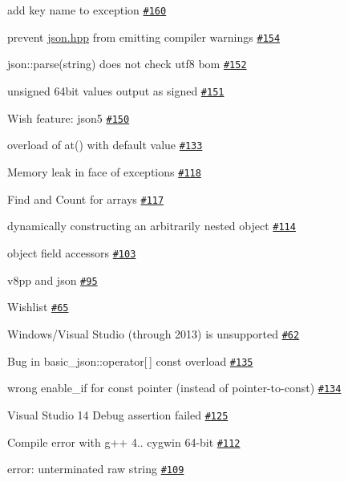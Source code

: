 \begin{DoxyItemize}
\item add key name to exception \href{https://github.com/nlohmann/json/issues/160}{\tt \#160}
\item prevent \hyperlink{a00257_source}{json.\+hpp} from emitting compiler warnings \href{https://github.com/nlohmann/json/issues/154}{\tt \#154}
\item json\+::parse(string) does not check utf8 bom \href{https://github.com/nlohmann/json/issues/152}{\tt \#152}
\item unsigned 64bit values output as signed \href{https://github.com/nlohmann/json/issues/151}{\tt \#151}
\item Wish feature\+: json5 \href{https://github.com/nlohmann/json/issues/150}{\tt \#150}
\item overload of at() with default value \href{https://github.com/nlohmann/json/issues/133}{\tt \#133}
\item Memory leak in face of exceptions \href{https://github.com/nlohmann/json/issues/118}{\tt \#118}
\item Find and Count for arrays \href{https://github.com/nlohmann/json/issues/117}{\tt \#117}
\item dynamically constructing an arbitrarily nested object \href{https://github.com/nlohmann/json/issues/114}{\tt \#114}
\item object field accessors \href{https://github.com/nlohmann/json/issues/103}{\tt \#103}
\item v8pp and json \href{https://github.com/nlohmann/json/issues/95}{\tt \#95}
\item Wishlist \href{https://github.com/nlohmann/json/issues/65}{\tt \#65}
\item Windows/\+Visual Studio (through 2013) is unsupported \href{https://github.com/nlohmann/json/issues/62}{\tt \#62}
\item Bug in basic\+\_\+json\+::operator\mbox{[}$\,$\mbox{]} const overload \href{https://github.com/nlohmann/json/issues/135}{\tt \#135}
\item wrong enable\+\_\+if for const pointer (instead of pointer-\/to-\/const) \href{https://github.com/nlohmann/json/issues/134}{\tt \#134}
\item Visual Studio 14 Debug assertion failed \href{https://github.com/nlohmann/json/issues/125}{\tt \#125}
\item Compile error with g++ 4.. cygwin 64-\/bit \href{https://github.com/nlohmann/json/issues/112}{\tt \#112}
\item error\+: unterminated raw string \href{https://github.com/nlohmann/json/issues/109}{\tt \#109}

\end{DoxyItemize}
